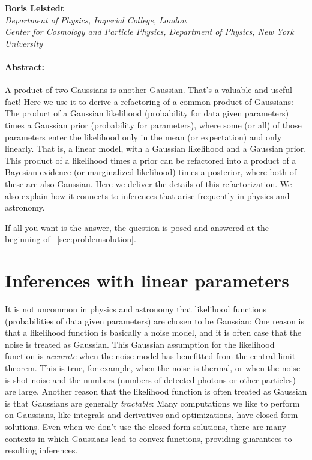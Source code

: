 \medskip\noindent\textbf{Boris Leistedt}\\
{\footnotesize%
  \textsl{Department of Physics, Imperial College, London}\\
  \textsl{Center for Cosmology and Particle Physics, Department of Physics, New York University}%
}

\paragraph{Abstract:}
A product of two Gaussians is another Gaussian.
That's a valuable and useful fact!
Here we use it to derive a refactoring of a common product of
Gaussians:
The product of a Gaussian likelihood (probability for data given
parameters) times a Gaussian prior (probability for parameters),
where some (or all) of those parameters enter the likelihood
only in the mean (or expectation) and only linearly.
That is, a linear model, with a Gaussian likelihood and a Gaussian
prior.
This product of a likelihood times a prior can be refactored into a
product of a Bayesian evidence (or marginalized likelihood)
times a posterior, where both of these are also Gaussian.
Here we deliver the details of this refactorization.
We also explain how it connects to inferences that arise frequently in
physics and astronomy.

If all you want is the answer, the question is posed and answered
at the beginning of \sectionname~\ref{sec:problemsolution}.

\section{Inferences with linear parameters}

It is not uncommon in physics and astronomy that likelihood functions
(probabilities of data given parameters) are chosen to be Gaussian:
One reason is that a likelihood function is basically a noise model,
and it is often case that the noise is treated as Gaussian.
This Gaussian assumption for the likelihood function is
\emph{accurate} when the noise model has benefitted from the central
limit theorem.
This is true, for example, when the noise is thermal, or when the
noise is shot noise and the numbers (numbers of detected photons or other
particles) are large.
Another reason that the likelihood function is often treated as
Gaussian is that Gaussians are generally \emph{tractable}:
Many computations we like to perform on Gaussians, like integrals and
derivatives and optimizations, have closed-form solutions.
Even when we don't use the closed-form solutions, there are many
contexts in which Gaussians lead to convex functions,
providing guarantees to resulting inferences.

